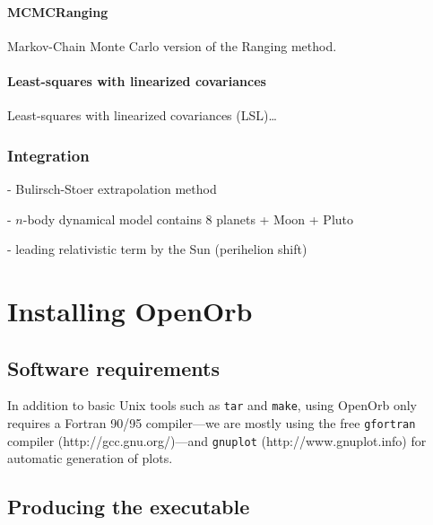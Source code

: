 \documentclass[12pt,english,twoside,a4paper]{report}
\begin{document}
\subsubsection{MCMCRanging}

Markov-Chain Monte Carlo version of the Ranging method.


\subsubsection{Least-squares with linearized covariances}

Least-squares with linearized covariances (LSL)\ldots

\subsection{Integration}

- Bulirsch-Stoer extrapolation method

- $n$-body dynamical model contains 8 planets + Moon + Pluto

- leading relativistic term by the Sun (perihelion shift)

\chapter{Installing OpenOrb}

\section{Software requirements}

In addition to basic Unix tools such as \verb|tar| and \verb|make|,
using OpenOrb only requires a Fortran 90/95 compiler---we are mostly
using the free \verb|gfortran| compiler (http://gcc.gnu.org/)---and
\verb|gnuplot| (http://www.gnuplot.info) for automatic generation of
plots.

\section{Producing the executable}
\end{document}
